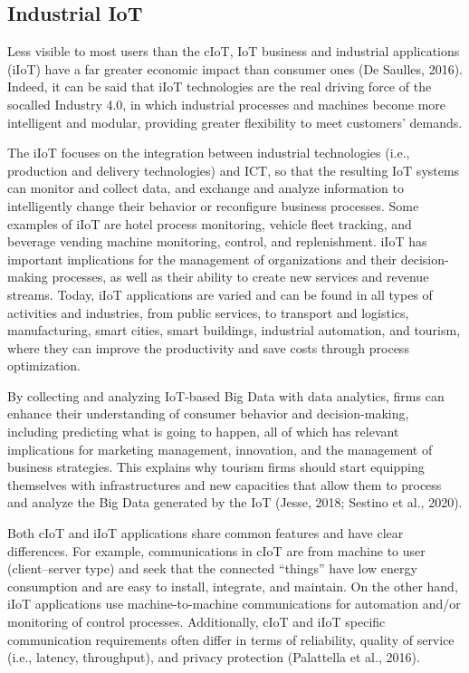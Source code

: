 \documentclass[
  letterpaper,
  DIV=11,
  numbers=noendperiod]{scrreprt}
\begin{document}
\hypertarget{industrial-iot}{%
\subsection{Industrial IoT}\label{industrial-iot}}

Less visible to most users than the cIoT, IoT business and industrial
applications (iIoT) have a far greater economic impact than consumer
ones (De Saulles, 2016). Indeed, it can be said that iIoT technologies
are the real driving force of the socalled Industry 4.0, in which
industrial processes and machines become more intelligent and modular,
providing greater flexibility to meet customers' demands.

The iIoT focuses on the integration between industrial technologies
(i.e., production and delivery technologies) and ICT, so that the
resulting IoT systems can monitor and collect data, and exchange and
analyze information to intelligently change their behavior or
reconfigure business processes. Some examples of iIoT are hotel process
monitoring, vehicle fleet tracking, and beverage vending machine
monitoring, control, and replenishment. iIoT has important implications
for the management of organizations and their decision-making processes,
as well as their ability to create new services and revenue streams.
Today, iIoT applications are varied and can be found in all types of
activities and industries, from public services, to transport and
logistics, manufacturing, smart cities, smart buildings, industrial
automation, and tourism, where they can improve the productivity and
save costs through process optimization.

By collecting and analyzing IoT-based Big Data with data analytics,
firms can enhance their understanding of consumer behavior and
decision-making, including predicting what is going to happen, all of
which has relevant implications for marketing management, innovation,
and the management of business strategies. This explains why tourism
firms should start equipping themselves with infrastructures and new
capacities that allow them to process and analyze the Big Data generated
by the IoT (Jesse, 2018; Sestino et al., 2020).

Both cIoT and iIoT applications share common features and have clear
differences. For example, communications in cIoT are from machine to
user (client--server type) and seek that the connected ``things'' have
low energy consumption and are easy to install, integrate, and maintain.
On the other hand, iIoT applications use machine-to-machine
communications for automation and/or monitoring of control processes.
Additionally, cIoT and iIoT specific communication requirements often
differ in terms of reliability, quality of service (i.e., latency,
throughput), and privacy protection (Palattella et al., 2016).
\end{document}
